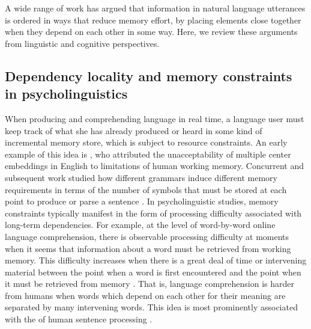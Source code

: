 A wide range of work has argued that information in natural language utterances is ordered in ways that reduce memory effort, by placing elements close together when they depend on each other in some way. Here, we review these arguments from linguistic and cognitive perspectives.

\subsection{Dependency locality and memory constraints in psycholinguistics}

When producing and comprehending language in real time, a language user must keep track of what she has already produced or heard in some kind of incremental memory store, which is subject to resource constraints.
An early example of this idea is \citet{miller-finitary-1963}, who attributed the unacceptability of multiple center embeddings in English to limitations of human working memory.
Concurrent and subsequent work studied how different grammars induce different memory requirements in terms of the number of symbols that must be stored at each point to produce or parse a sentence \citep{yngve1960modelabney1991memory,gibson1991computational,resnik1992left}. 
In psycholinguistic studies, memory constraints typically manifest in the form of processing difficulty associated with long-term dependencies.
For example, at the level of word-by-word online language comprehension, there is observable processing difficulty at moments when it seems that information about a word must be retrieved from working memory. 
This difficulty increases when there is a great deal of time or intervening material between the point when a word is first encountered and the point when it must be retrieved from memory  \citep{gibson1998linguistic,gibson1999memory,gibson2000dependency,mcelree2000sentence,lewis-activation-based-2005,bartek-search-2011,nicenboim2015working}. 
That is, language comprehension is harder from humans when words which depend on each other for their meaning are separated by many intervening words.
This idea is most prominently associated with the  of human sentence processing \citep{gibson2000dependency}.

